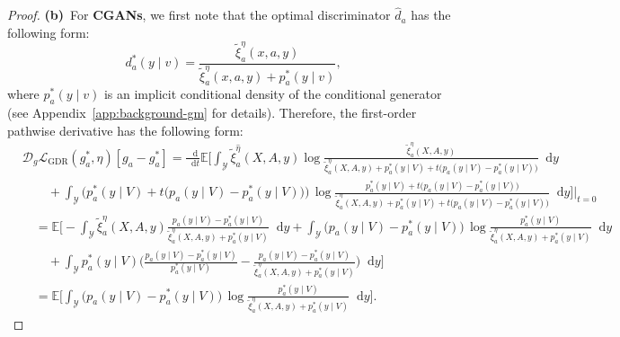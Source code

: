 \documentclass[dvipsnames]{article} %
\newcommand*\diff{\mathop{}\!\mathrm{d}}
\begin{document}
\begin{proof}
    \textbf{(b)}~For \textbf{CGANs}, we first note that the optimal discriminator $\hat{d}_a$ has the following form:
    \begin{equation}
        {d}^*_a(y \mid v) = \frac{\tilde{\xi}^{{\eta}}_a(x, a, y)}{\tilde{\xi}^{{\eta}}_a(x, a, y) + {p}^*_a(y \mid v)},
    \end{equation}
    where ${p}^*_a(y \mid v)$ is an implicit conditional density of the conditional generator (see Appendix~\ref{app:background-gm} for details). Therefore, the first-order pathwise derivative has the following form:
     \begingroup\makeatletter\def\f@size{8}\check@mathfonts
    \begin{align}
        &  \mathcal{D}_g\mathcal{L}_\text{{GDR}}(g_a^*, \eta)[g_a - g_a^*] =  \frac{\diff}{\diff t} \mathbb{E} \bigg[\int_{\mathcal{Y}}\tilde{\xi}^{\hat{\eta}}_a(X, A, y)  \log \frac{\tilde{\xi}^{{\eta}}_a(X, A, y)}{\tilde{\xi}^{{\eta}}_a(X, A, y) + {p}_a^*(y \mid V) + t\big({p}_a(y \mid V) - {p}_a^*(y \mid V)\big)} \diff y  \\
        & \quad \quad+ \int_{\mathcal{Y}}\Big({p}_a^*(y \mid V) + t\big( {p}_a(y \mid V) - {p}_a^*(y \mid V)\big)\Big) \, \log \frac{{p}_a^*(y \mid V) + t\big( {p}_a(y \mid V) - {p}_a^*(y \mid V)\big)}{\tilde{\xi}^{{\eta}}_a(X, A, y) + {p}_a^*(y \mid V) + t\big( {p}_a(y \mid V) - {p}_a^*(y \mid V)\big)} \diff y \bigg] \bigg|_{t=0} \nonumber \\
        & \quad  = \mathbb{E} \bigg[-\int_{\mathcal{Y}}\tilde{\xi}^{{\eta}}_a(X, A, y)  \frac{{p}_a(y \mid V) - {p}_a^*(y \mid V)}{\tilde{\xi}^{{\eta}}_a(X, A, y) + {p}_a^*(y \mid V)} \diff y  + \int_{\mathcal{Y}} \Big({p}_a(y \mid V) - {p}_a^*(y \mid V)\Big) \, \log \frac{{p}_a^*(y \mid V)}{\tilde{\xi}^{{\eta}}_a(X, A, y) + {p}_a^*(y \mid V)} \diff y  \\
        & \quad\quad + \int_{\mathcal{Y}} {p}_a^*(y \mid V) \bigg( \frac{{p}_a(y \mid V) - {p}_a^*(y \mid V)}{{p}_a^*(y \mid V)} - \frac{{p}_a(y \mid V) - {p}_a^*(y \mid V)}{\tilde{\xi}^{{\eta}}_a(X, A, y) + {p}_a^*(y \mid V)}\bigg)\diff y \Bigg] \nonumber \\
        & \quad = \mathbb{E} \bigg[\int_{\mathcal{Y}} \Big({p}_a(y \mid V) - {p}_a^*(y \mid V)\Big) \, \log \frac{{p}_a^*(y \mid V)}{\tilde{\xi}^{{\eta}}_a(X, A, y) + {p}_a^*(y \mid V)} \diff y \bigg].
    \end{align}
    \endgroup


\end{proof}
\end{document}
